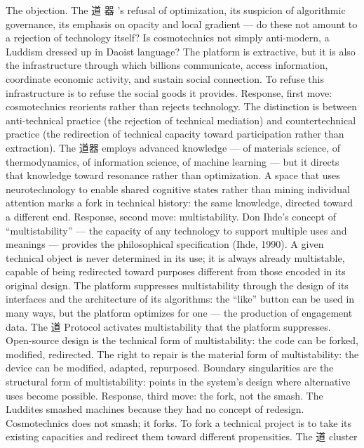 The objection. The 道 器 ’s refusal of optimization, its suspicion of algorithmic governance, its emphasis on opacity and local gradient — do these not amount to a rejection of technology itself? Is cosmotechnics not simply anti-modern, a Luddism dressed up in Daoist language? The platform is extractive, but it is also the infrastructure through which billions communicate, access information, coordinate economic activity, and sustain social connection. To refuse this infrastructure is to refuse the social goods it provides. Response, first move: cosmotechnics reorients rather than rejects technology. The distinction is between anti-technical practice (the rejection of technical mediation) and countertechnical practice (the redirection of technical capacity toward participation rather than extraction). The 道器 employs advanced knowledge — of materials science, of thermodynamics, of information science, of machine learning — but it directs that knowledge toward resonance rather than optimization. A space that uses neurotechnology to enable shared cognitive states rather than mining individual attention marks a fork in technical history: the same knowledge, directed toward a different end. Response, second move: multistability. Don Ihde’s concept of “multistability” — the capacity of any technology to support multiple uses and meanings — provides the philosophical specification (Ihde, 1990). A given technical object is never determined in its use; it is always already multistable, capable of being redirected toward purposes different from those encoded in its original design. The platform suppresses multistability through the design of its interfaces and the architecture of its algorithms: the “like” button can be used in many ways, but the platform optimizes for one — the production of engagement data. The 道 Protocol activates multistability that the platform suppresses. Open-source design is the technical form of multistability: the code can be forked, modified, redirected. The right to repair is the material form of multistability: the device can be modified, adapted, repurposed. Boundary singularities are the structural form of multistability: points in the system’s design where alternative uses become possible. Response, third move: the fork, not the smash. The Luddites smashed machines because they had no concept of redesign. Cosmotechnics does not smash; it forks. To fork a technical project is to take its existing capacities and redirect them toward different propensities. The 道 cluster

